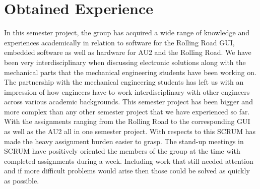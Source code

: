 \chapter{Obtained Experience}
In this semester project, the group has acquired a wide range of knowledge and experiences academically in relation to software for the Rolling Road GUI, embedded software as well as hardware for AU2 and the Rolling Road. We have been very interdisciplinary when discussing electronic solutions along with the mechanical parts that the mechanical engineering students have been working on. The partnership with the mechanical engineering students has left us with an impression of how engineers have to work interdisciplinary with other engineers across various academic backgrounds. This semester project has been bigger and more complex than any other semester project that we have experienced so far. With the assignments ranging from the Rolling Road to the corresponding GUI as well as the AU2 all in one semester project. With respects to this SCRUM has made the heavy assignment burden easier to grasp. The stand-up meetings in SCRUM have positively oriented the members of the group at the time with completed assignments during a week. Including work that still needed attention and if more difficult problems would arise then those could be solved as quickly as possible.






